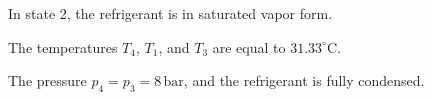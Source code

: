 In state 2, the refrigerant is in saturated vapor form.  

The temperatures \( T_4 \), \( T_1 \), and \( T_3 \) are equal to \( 31.33^\circ\text{C} \).  

The pressure \( p_4 = p_3 = 8 \, \text{bar} \), and the refrigerant is fully condensed.